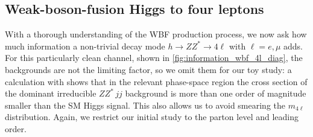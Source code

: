 




\subsection{Weak-boson-fusion Higgs to four leptons}
\label{sec:information_wbf_4l}

With a thorough understanding of the WBF production process, we now
ask how much information a non-trivial decay mode
$h \to ZZ^* \to 4 \ell$ with $\ell = e, \mu$ adds. For this
particularly clean channel, shown in
\autoref{fig:information_wbf_4l_diag}, the backgrounds are not the
limiting factor, so we omit them for our toy study: a calculation with
 shows that in the relevant phase-space region
the cross section of the dominant irreducible $ZZ^* \,jj$ background
is more than one order of magnitude smaller than the SM Higgs signal. This
also allows us to avoid smearing the $m_{4\ell}$ distribution. Again,
we restrict our initial study to the parton level and leading order.


